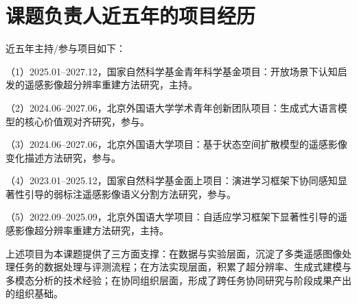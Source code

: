 \section{课题负责人近五年的项目经历}

近五年主持/参与项目如下：

（1）2025.01--2027.12，国家自然科学基金青年科学基金项目：开放场景下认知启发的遥感影像超分辨率重建方法研究，主持。

（2）2024.06--2027.06，北京外国语大学学术青年创新团队项目：生成式大语言模型的核心价值观对齐研究，参与。

（3）2024.06--2027.06，北京外国语大学项目：基于状态空间扩散模型的遥感影像变化描述方法研究，参与。

（4）2023.01--2025.12，国家自然科学基金面上项目：演进学习框架下协同感知显著性引导的弱标注遥感影像语义分割方法研究，参与。

（5）2022.09--2025.09，北京外国语大学项目：自适应学习框架下显著性引导的遥感影像超分辨率重建方法研究，主持。

上述项目为本课题提供了三方面支撑：在数据与实验层面，沉淀了多类遥感图像处理任务的数据处理与评测流程；在方法实现层面，积累了超分辨率、生成式建模与多模态分析的技术经验；在协同组织层面，形成了跨任务协同研究与阶段成果产出的组织基础。